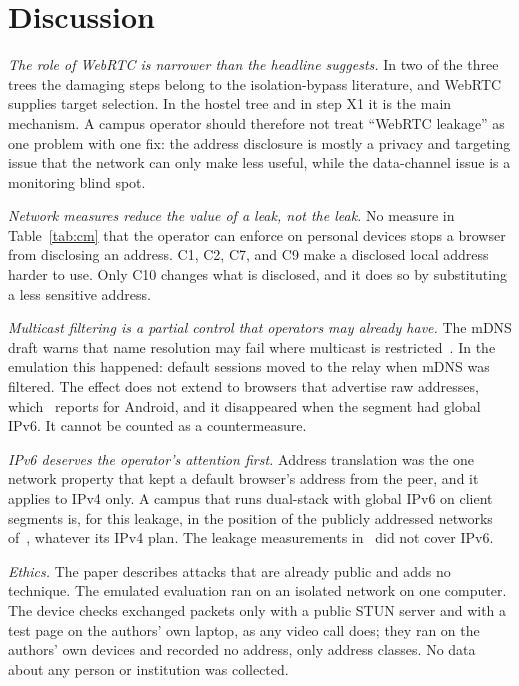 \documentclass[conference]{IEEEtran}
\begin{document}
\section{Discussion}
\label{sec:discussion}
\textit{The role of WebRTC is narrower than the headline suggests.} In two of the three trees the damaging steps belong to the isolation-bypass literature, and WebRTC supplies target selection. In the hostel tree and in step X1 it is the main mechanism. A campus operator should therefore not treat ``WebRTC leakage'' as one problem with one fix: the address disclosure is mostly a privacy and targeting issue that the network can only make less useful, while the data-channel issue is a monitoring blind spot.

\textit{Network measures reduce the value of a leak, not the leak.} No measure in Table~\ref{tab:cm} that the operator can enforce on personal devices stops a browser from disclosing an address. C1, C2, C7, and C9 make a disclosed local address harder to use. Only C10 changes what is disclosed, and it does so by substituting a less sensitive address.

\textit{Multicast filtering is a partial control that operators may already have.} The mDNS draft warns that name resolution may fail where multicast is restricted~\cite{mdnsdraft}. In the emulation this happened: default sessions moved to the relay when mDNS was filtered. The effect does not extend to browsers that advertise raw addresses, which~\cite{koysha2025} reports for Android, and it disappeared when the segment had global IPv6. It cannot be counted as a countermeasure.

\textit{IPv6 deserves the operator's attention first.} Address translation was the one network property that kept a default browser's address from the peer, and it applies to IPv4 only. A campus that runs dual-stack with global IPv6 on client segments is, for this leakage, in the position of the publicly addressed networks of~\cite{nibert2025}, whatever its IPv4 plan. The leakage measurements in~\cite{koysha2025} did not cover IPv6.

\textit{Ethics.} The paper describes attacks that are already public and adds no technique. The emulated evaluation ran on an isolated network on one computer. The device checks exchanged packets only with a public STUN server and with a test page on the authors' own laptop, as any video call does; they ran on the authors' own devices and recorded no address, only address classes. No data about any person or institution was collected.
\end{document}
